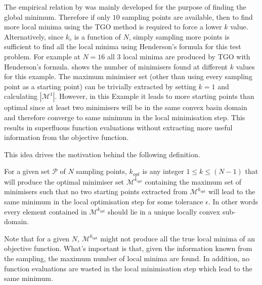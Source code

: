 The empirical relation by \citet{Henderson2015} was mainly developed for the purpose of finding the global minimum. Therefore if only $10$ sampling points are available, then to find more local minima using the TGO method is required to force a lower $k$ value. Alternatively, since $k_c$ is a function of $N$, simply sampling more points is sufficient to find all the local minima using Henderson's formula for this test problem. For example at $N=16$ all 3 local minima are produced by TGO with Henderson's formula.  shows the number of minimisers found at different $k$ values for this example. The maximum minimiser set (other than using every sampling point as a starting point) can be trivially extracted by setting $k=1$ and calculating $|\mathcal{M}^1|$. However, in this Example it leads to more starting points than optimal since at least two minimisers will be in the same convex basin domain and therefore converge to same minimum in the local minimisation step. This results in superfluous function evaluations without extracting more useful information from the objective function. 

This idea drives the motivation behind the following definition.
\begin{definition} \label{def:optpool}
For a given set $\mathcal{P}$ of $N$ sampling points, $k_{opt}$ is any integer $1 \leq k \leq (N -1)$ that will produce the optimal minimiser set $\mathcal{M}^{k_{opt}}$ containing the maximum set of minimisers such that no two starting points extracted from $\mathcal{M}^{k_{opt}}$ will lead to the same minimum in the local optimisation step for some tolerance $\epsilon$. In other words every element contained in $\mathcal{M}^{k_{opt}}$ should lie in a unique locally convex sub-domain.
\end{definition}

Note that for a given $N$, $\mathcal{M}^{k_{opt}}$ might not produce all the true local minima of an objective function. What's important is that, given the information known from the sampling, the maximum number of local minima are found. In addition, no function evaluations are wasted in the local minimisation step which lead to the same minimum.


